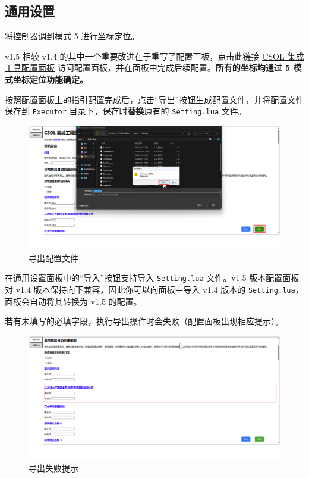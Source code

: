 \subsection{通用设置}

将控制器调到模式 5 进行坐标定位。

v1.5 相较 v1.4 的其中一个重要改进在于重写了配置面板，点击此链接 \href{https://www.macrohard.fun/CSOL-Utilities/ConfigPanel}{CSOL 集成工具配置面板} 访问配置面板，并在面板中完成后续配置。\textbf{\color{red}所有的坐标均通过 5 模式坐标定位功能确定。}

按照配置面板上的指引配置完成后，点击“导出”按钮生成配置文件，并将配置文件保存到 \lstinline{Executor} 目录下，保存时\textbf{\color{red}替换}原有的 \lstinline{Setting.lua} 文件。

\begin{figure}[H]
    \Centering
    \includegraphics[width=\textwidth]{assets/export_setting}
    \caption{导出配置文件}
    \label{ch2fig-export-setting}
\end{figure}

在通用设置面板中的“导入”按钮支持导入 \lstinline{Setting.lua} 文件。v1.5 版本配置面板对 v1.4 版本保持向下兼容，因此你可以向面板中导入 v1.4 版本的 \lstinline{Setting.lua}，面板会自动将其转换为 v1.5 的配置。

若有未填写的必填字段，执行导出操作时会失败（配置面板出现相应提示）。

\begin{figure}[H]
    \Centering
    \includegraphics[width=\textwidth]{assets/export_error}
    \caption{导出失败提示}
\end{figure}

